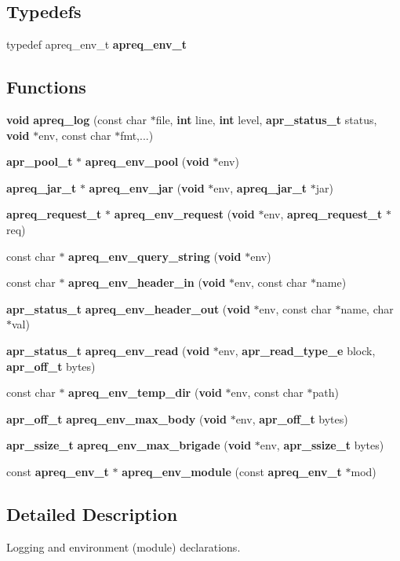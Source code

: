 \subsection*{Typedefs}
\begin{CompactItemize}
\item 
typedef apreq\_\-env\_\-t {\bf apreq\_\-env\_\-t}
\end{CompactItemize}
\subsection*{Functions}
\begin{CompactItemize}
\item 
{\bf void} {\bf apreq\_\-log} (const char $\ast$file, {\bf int} line, {\bf int} level, {\bf apr\_\-status\_\-t} status, {\bf void} $\ast$env, const char $\ast$fmt,...)
\item 
{\bf apr\_\-pool\_\-t} $\ast$ {\bf apreq\_\-env\_\-pool} ({\bf void} $\ast$env)
\item 
{\bf apreq\_\-jar\_\-t} $\ast$ {\bf apreq\_\-env\_\-jar} ({\bf void} $\ast$env, {\bf apreq\_\-jar\_\-t} $\ast$jar)
\item 
{\bf apreq\_\-request\_\-t} $\ast$ {\bf apreq\_\-env\_\-request} ({\bf void} $\ast$env, {\bf apreq\_\-request\_\-t} $\ast$req)
\item 
const char $\ast$ {\bf apreq\_\-env\_\-query\_\-string} ({\bf void} $\ast$env)
\item 
const char $\ast$ {\bf apreq\_\-env\_\-header\_\-in} ({\bf void} $\ast$env, const char $\ast$name)
\item 
{\bf apr\_\-status\_\-t} {\bf apreq\_\-env\_\-header\_\-out} ({\bf void} $\ast$env, const char $\ast$name, char $\ast$val)
\item 
{\bf apr\_\-status\_\-t} {\bf apreq\_\-env\_\-read} ({\bf void} $\ast$env, {\bf apr\_\-read\_\-type\_\-e} block, {\bf apr\_\-off\_\-t} bytes)
\item 
const char $\ast$ {\bf apreq\_\-env\_\-temp\_\-dir} ({\bf void} $\ast$env, const char $\ast$path)
\item 
{\bf apr\_\-off\_\-t} {\bf apreq\_\-env\_\-max\_\-body} ({\bf void} $\ast$env, {\bf apr\_\-off\_\-t} bytes)
\item 
{\bf apr\_\-ssize\_\-t} {\bf apreq\_\-env\_\-max\_\-brigade} ({\bf void} $\ast$env, {\bf apr\_\-ssize\_\-t} bytes)
\item 
const {\bf apreq\_\-env\_\-t} $\ast$ {\bf apreq\_\-env\_\-module} (const {\bf apreq\_\-env\_\-t} $\ast$mod)
\end{CompactItemize}


\subsection{Detailed Description}
Logging and environment (module) declarations.



